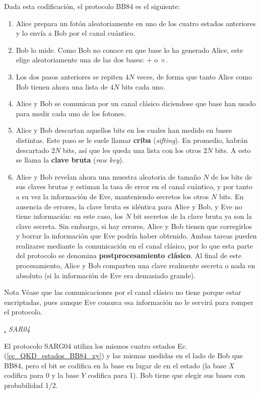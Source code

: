 \documentclass[a4paper,11pt]{book} %
\numberwithin{equation}{chapter}
\def\subsubiContadorIt{\par\addtocounter{subsubsection}{1}\underline{\it\thesubsubsection.}\hskip0.5cm \setcounter{subsubsubsectionIt}{0}}
\newcommand{\SubsubiIt}[1]{
		\subsubiContadorIt \textit{#1}
	}
\newcounter{subsubsubsectionIt}[subsubsection]
\begin{document}
Dada esta codificación, el protocolo BB84 es el siguiente:
\begin{enumerate}
	\item Alice prepara un fotón aleatoriamente en uno de los cuatro estados anteriores y lo envía a Bob por el canal cuántico. 
	\item Bob lo mide. Como Bob no conoce en que base lo ha generado Alice, este elige aleatoriamente una de las dos bases: $+$ o $\times$. 
	\item Los dos pasos anteriores se repiten $4N$ veces, de forma que tanto Alice como Bob tienen ahora una lista de $4N$ bits cada uno.
	\item Alice y Bob se comunican por un canal clásico diciendose que base han usado para medir cada uno de los fotones.
	\item Alice y Bob descartan aquellos bits en los cuales han medido en bases distintas. Este paso se le suele llamar \textbf{criba} (\textit{sifting}).  En promedio, habrán descartado $2N$ bits, así que les queda una lista con los otros $2N$ bits. A esto se llama la \textbf{clave bruta} (\textit{raw key}).
	\item  Alice y Bob revelan ahora una muestra aleatoria de tamaño $N$ de los bits de sus claves brutas y estiman la tasa de error en el canal cuántico, y por tanto a su vez la información de Eve, manteniendo secretos los otros $N$ bits. En ausencia de errores, la clave bruta es idéntica para Alice y Bob, y Eve no tiene información: en este caso, los $N$ bit secretos de la clave bruta ya son la clave secreta. Sin embargo, si hay errores, Alice y Bob tienen que corregirlos y borrar la información que Eve podría haber obtenido. Ambas tareas pueden realizarse mediante la comunicación en el canal clásico, por lo que esta parte del protocolo se denomina \textbf{postprocesamiento clásico}. Al final de este procesamiento, Alice y Bob comparten una clave realmente secreta o nada en absoluto (si la información de Eve era demasiado grande).
\end{enumerate}


	\begin{mybox_blue}{Nota}
	Véase que las comunicaciones por el canal clásico no tiene porque estar encriptadas, pues aunque Eve conozca esa información no le servirá para romper el protocolo.
	\end{mybox_blue}


			\SubsubiIt{SAR04}

El protocolo SARG04 \cite{bib_SAR04_1,bib_SAR04_2} utiliza los mismos cuatro estados Ec. (\ref{ec_QKD_estados_BB84_xy}) y las mismas medidas en el lado de Bob que BB84, pero el bit se codifica en la base en lugar de en el estado (la base $X$ codifica para 0 y la base $Y$ codifica para 1). Bob tiene que elegir sus bases con probabilidad 1/2. 
\end{document}
